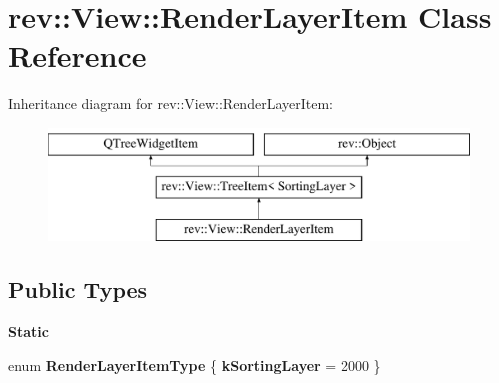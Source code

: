\hypertarget{classrev_1_1_view_1_1_render_layer_item}{}\section{rev\+::View\+::Render\+Layer\+Item Class Reference}
\label{classrev_1_1_view_1_1_render_layer_item}
Inheritance diagram for rev\+::View\+::Render\+Layer\+Item\+:\begin{figure}[H]
\begin{center}
\leavevmode
\includegraphics[height=3.000000cm]{classrev_1_1_view_1_1_render_layer_item}
\end{center}
\end{figure}
\subsection*{Public Types}
\begin{Indent}\textbf{ Static}\par
\begin{DoxyCompactItemize}
\item 
\mbox{\label{classrev_1_1_view_1_1_render_layer_item_aa1af0deaa3f4f556db5724b03e8a7327}} 
enum {\bfseries Render\+Layer\+Item\+Type} \{ {\bfseries k\+Sorting\+Layer} = 2000
 \}
\end{DoxyCompactItemize}
\end{Indent}
